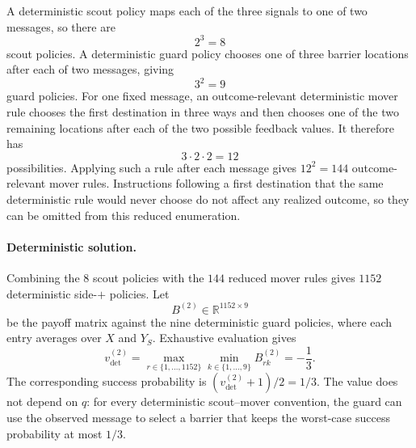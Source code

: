 A deterministic scout policy maps each of the three signals to one of two messages, so there are
\[
    2^3=8
\]
scout policies. A deterministic guard policy chooses one of three barrier locations after each of two messages, giving
\[
    3^2=9
\]
guard policies. For one fixed message, an outcome-relevant deterministic mover rule chooses the first destination in three ways and then chooses one of the two remaining locations after each of the two possible feedback values. It therefore has
\[
    3\cdot2\cdot2=12
\]
possibilities. Applying such a rule after each message gives $12^2=144$ outcome-relevant mover rules. Instructions following a first destination that the same deterministic rule would never choose do not affect any realized outcome, so they can be omitted from this reduced enumeration.

\paragraph{Deterministic solution.}
Combining the $8$ scout policies with the $144$ reduced mover rules gives $1152$ deterministic side-$+$ policies. Let
\[
    B^{(2)}\in\mathbb{R}^{1152\times9}
\]
be the payoff matrix against the nine deterministic guard policies, where each entry averages over $X$ and $Y_S$. Exhaustive evaluation gives
\[
    v_{\mathrm{det}}^{(2)}
    =
    \max_{r\in\{1,\ldots,1152\}}
    \min_{k\in\{1,\ldots,9\}}
    B^{(2)}_{rk}
    =
    -\frac13.
\]
The corresponding success probability is $(v_{\mathrm{det}}^{(2)}+1)/2=1/3$. The value does not depend on $q$: for every deterministic scout--mover convention, the guard can use the observed message to select a barrier that keeps the worst-case success probability at most $1/3$.


